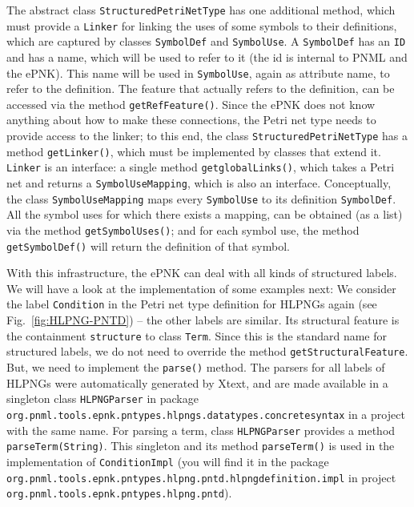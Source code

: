 The abstract class {\tt StructuredPetriNetType}%
has one additional method, which must provide a {\tt Linker}%
for linking the uses of some symbols to their definitions, which are captured by
classes {\tt SymbolDef}%
and {\tt SymbolUse}.%
A {\tt SymbolDef} has an {\tt ID}%
and has a name, which will be used to refer to it (the id is internal to PNML
and the ePNK). This name will be used in {\tt SymbolUse}, again as
attribute name, to refer to the definition. The feature that actually refers to the definition, can
be accessed via the method {\tt getRefFeature()}.%
Since the ePNK does not know anything about how to make these connections, the
Petri net type needs to provide access to the linker; to this end, the class
{\tt StructuredPetriNetType} has a method {\tt getLinker()},%
which must be implemented by classes that extend it. {\tt Linker} is an
interface: a single method {\tt getglobalLinks()},%
which takes a Petri net and returns a {\tt SymbolUseMapping},%
which is also an interface. Conceptually, the class {\tt SymbolUseMapping} maps
every {\tt SymbolUse} to its definition {\tt SymbolDef}. All the symbol uses for
which there exists a mapping, can be obtained (as a list) via the method
{\tt getSymbolUses()};%
and for each symbol use, the method
{\tt getSymbolDef()}%
will return the definition of that symbol. 

With this infrastructure, the ePNK can deal with all kinds of structured
labels. We will have a look at the implementation of some examples next:  We
consider the label {\tt Condition} in the Petri net type definition for HLPNGs
again (see Fig.~\ref{fig:HLPNG-PNTD}) -- the other labels are similar. Its
structural feature is the containment {\tt structure} to class {\tt Term}.
Since this is the standard name for structured labels, we do not need to
override the method {\tt getStructuralFeature}.%
But, we need to implement the {\tt parse()} method.  The parsers for all labels
of HLPNGs were automatically generated by Xtext, and are made available in a
singleton class {\tt HLPNGParser} in package
{\tt org.pnml.tools.epnk.pntypes.hlpngs.datatypes.concretesyntax}
in a project with the same name. For parsing a term, class {\tt HLPNGParser}
provides a method {\tt parseTerm(String)}. This singleton and its method
{\tt parseTerm()} is used in the implementation of {\tt ConditionImpl}
(you will find it in the package
{\tt org.pnml.tools.epnk.pntypes.hlpng.pntd.hlpngdefinition.impl}
in project {\tt org.pnml.tools.epnk.pntypes.hlpng.pntd}).

